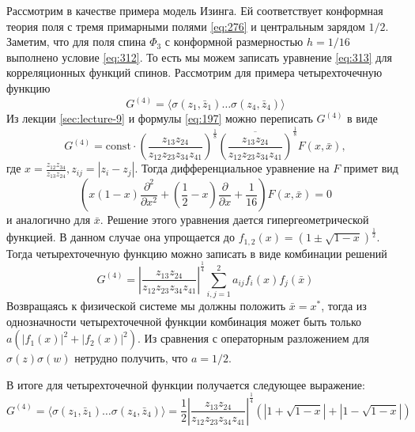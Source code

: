 \documentclass[a4paper,12pt]{article} \usepackage[utf8x]{inputenc} \usepackage[russian]{babel}
\theoremstyle{definition} \newtheorem{corollary}{Corollary}[theorem] \theoremstyle{definition}
\begin{document}
Рассмотрим в качестве примера модель Изинга. Ей соответствует конформная теория поля с тремя
примарными полями \eqref{eq:276} и центральным зарядом $1/2$. Заметим, что для поля спина $\Phi_{3}$
с конформной размерностью $h=1/16$ выполнено условие \eqref{eq:312}. То есть мы можем записать
уравнение \eqref{eq:313} для корреляционных функций спинов. Рассмотрим для примера четырехточечную
функцию
\begin{equation}
  \label{eq:314} G^{(4)} =\langle \sigma(z_1,\bar z_1)\dots \sigma(z_4,\bar z_4)\rangle
\end{equation} Из лекции \ref{sec:lecture-9} и формулы \eqref{eq:197} можно переписать $G^{(4)}$ в
виде
\begin{equation}
  \label{eq:315} G^{(4)} = \mathrm{const}\cdot \left(\frac{z_{13}z_{24}}{z_{12}
z_{23}z_{34}z_{41}}\right)^{\frac{1}{8}} \overline{ \left(\frac{z_{13}z_{24}}{z_{12}
z_{23}z_{34}z_{41}}\right)}^{\frac{1}{8}}F(x,\bar x),
\end{equation} где $x=\frac{z_{12}z_{34}}{z_{13}z_{24}}, z_{ij}=\left| z_{i}-z_{j}\right|$. Тогда
дифференциальное уравнение на $F$ примет вид
\begin{equation}
  \label{eq:316} \left( x(1-x) \frac{\partial^{2}}{\partial x^{2}}
+(\frac{1}{2}-x)\frac{\partial}{\partial x}+\frac{1}{16}\right) F(x,\bar x)=0
\end{equation} и аналогично для $\bar x$. Решение этого уравнения дается гипергеометрической
функцией. В данном случае она упрощается до $f_{1,2}(x)=(1\pm \sqrt{1-x})^{\frac{1}{2}}$. Тогда
четырехточечную функцию можно записать в виде комбинации решений
\begin{equation}
  \label{eq:317} G^{(4)} = \left|\frac{z_{13}z_{24}}{z_{12}
z_{23}z_{34}z_{41}}\right|^{\frac{1}{4}}\sum_{i,j=1}^{2}a_{ij}f_{i}(x)f_{j}(\bar x)
\end{equation} Возвращаясь к физической системе мы должны положить $\bar x= x^{*}$, тогда из
однозначности четырехточечной функции комбинация может быть только
$a(|f_{1}(x)|^{2}+|f_{2}(x)|^{2})$. Из сравнения с операторным разложением для $\sigma(z)\sigma(w)$
нетрудно получить, что $a=1/2$.

В итоге для четырехточечной функции получается следующее выражение:
\begin{equation}
  \label{eq:302} G^{(4)} =\langle \sigma(z_1,\bar z_1)\dots \sigma(z_4,\bar z_4)\rangle =
\frac{1}{2} \left|\frac{z_{13}z_{24}}{z_{12}
z_{23}z_{34}z_{41}}\right|^{\frac{1}{4}}\left(\left|1+\sqrt{1-x}\right| +
\left|1-\sqrt{1-x}\right|\right)
\end{equation}
\end{document}

